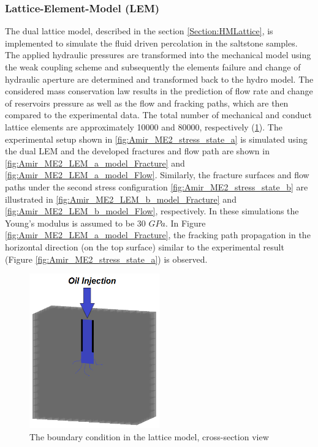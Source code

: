 \subsubsection*{Lattice-Element-Model (LEM)}

The dual lattice model, described in the section \ref{Section:HMLattice}, is implemented to simulate the fluid driven percolation in the saltstone samples. The applied hydraulic pressures are transformed into the mechanical model using the weak coupling scheme and subsequently the elements failure and change of hydraulic aperture are determined and transformed back to the hydro model. The considered mass conservation law results in the prediction of flow rate and change of reservoirs pressure as well as the flow and fracking paths, which are then compared to the experimental data. The total number of mechanical and conduct lattice elements are approximately 10000 and 80000, respectively (\ref{fig:Amir_ME2_LEM_a_model}).  The experimental setup shown in \ref{fig:Amir_ME2_stress_state_a} is simulated using  the dual LEM and the developed fractures and flow path are shown in \ref{fig:Amir_ME2_LEM_a_model_Fracture} and \ref{fig:Amir_ME2_LEM_a_model_Flow}. Similarly, the fracture surfaces and flow paths under the second stress configuration \ref{fig:Amir_ME2_stress_state_b} are illustrated in \ref{fig:Amir_ME2_LEM_b_model_Fracture} and \ref{fig:Amir_ME2_LEM_b_model_Flow}, respectively. In these simulations the Young's modulus is assumed to be 30 $GPa$. In Figure \ref{fig:Amir_ME2_LEM_a_model_Fracture}, the fracking path propagation in the horizontal direction (on the top surface) similar to the experimental result (Figure \ref{fig:Amir_ME2_stress_state_a}) is observed. 

\begin{figure}[!ht]
\centering
\includegraphics[width=0.5\textwidth]{figures/Amir_ME2_LEM_a_model.png}
\caption{The boundary condition in the lattice model, cross-section view}
\label{fig:Amir_ME2_LEM_a_model}
\end{figure}

